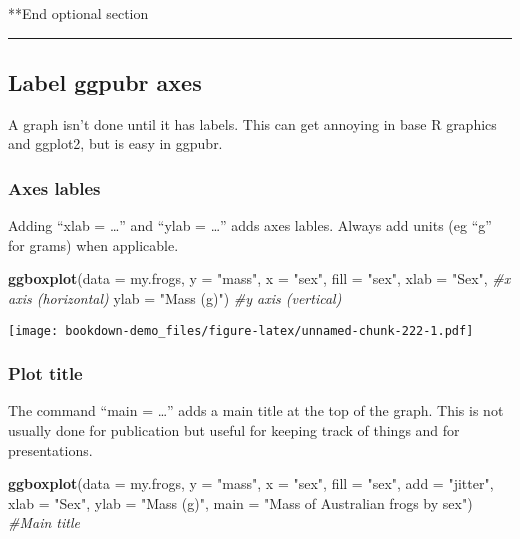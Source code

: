 \documentclass[]{book}
\newenvironment{Shaded}{\begin{snugshade}}{\end{snugshade}}
\newcommand{\KeywordTok}[1]{\textcolor[rgb]{0.13,0.29,0.53}{\textbf{#1}}}
\newcommand{\DataTypeTok}[1]{\textcolor[rgb]{0.13,0.29,0.53}{#1}}
\newcommand{\StringTok}[1]{\textcolor[rgb]{0.31,0.60,0.02}{#1}}
\newcommand{\CommentTok}[1]{\textcolor[rgb]{0.56,0.35,0.01}{\textit{#1}}}
\newcommand{\NormalTok}[1]{#1}
\theoremstyle{definition}
\theoremstyle{definition}
\theoremstyle{definition}
\theoremstyle{remark}
\begin{document}
**End optional section

\begin{center}\rule{0.5\linewidth}{\linethickness}\end{center}

\subsection{Label ggpubr axes}\label{label-ggpubr-axes}

A graph isn't done until it has labels. This can get annoying in base R
graphics and ggplot2, but is easy in ggpubr.

\subsubsection{Axes lables}\label{axes-lables}

Adding ``xlab = \ldots{}'' and ``ylab = \ldots{}'' adds axes lables.
Always add units (eg ``g'' for grams) when applicable.

\begin{Shaded}
\begin{Highlighting}[]
\KeywordTok{ggboxplot}\NormalTok{(}\DataTypeTok{data =}\NormalTok{ my.frogs,}
          \DataTypeTok{y =} \StringTok{"mass"}\NormalTok{,}
          \DataTypeTok{x =} \StringTok{"sex"}\NormalTok{,}
          \DataTypeTok{fill =} \StringTok{"sex"}\NormalTok{,}
          \DataTypeTok{xlab =} \StringTok{"Sex"}\NormalTok{,      }\CommentTok{#x axis (horizontal)}
          \DataTypeTok{ylab =} \StringTok{"Mass (g)"}\NormalTok{) }\CommentTok{#y axis (vertical)}
\end{Highlighting}
\end{Shaded}

\texttt{[image: bookdown-demo\_files/figure-latex/unnamed-chunk-222-1.pdf]}

\subsubsection{Plot title}\label{plot-title}

The command ``main = \ldots{}'' adds a main title at the top of the
graph. This is not usually done for publication but useful for keeping
track of things and for presentations.

\begin{Shaded}
\begin{Highlighting}[]
\KeywordTok{ggboxplot}\NormalTok{(}\DataTypeTok{data =}\NormalTok{ my.frogs,}
          \DataTypeTok{y =} \StringTok{"mass"}\NormalTok{,}
          \DataTypeTok{x =} \StringTok{"sex"}\NormalTok{,}
          \DataTypeTok{fill =} \StringTok{"sex"}\NormalTok{,}
          \DataTypeTok{add =} \StringTok{"jitter"}\NormalTok{,}
          \DataTypeTok{xlab =} \StringTok{"Sex"}\NormalTok{,}
          \DataTypeTok{ylab =} \StringTok{"Mass (g)"}\NormalTok{,}
          \DataTypeTok{main =} \StringTok{"Mass of Australian frogs by sex"}\NormalTok{) }\CommentTok{#Main title}
\end{Highlighting}
\end{Shaded}
\end{document}
